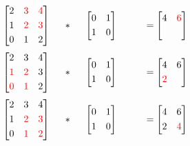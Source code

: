 \[
\begin{bmatrix}
       2 & \textcolor{red}3 & \textcolor{red}4           \\[0.3em]
       1 & \textcolor{red}2 & \textcolor{red}3 \\[0.3em]
       0 & 1 & 2
     \end{bmatrix}
\hspace*{0.5cm}
*
\hspace*{0.5cm}
\begin{bmatrix}
       0 & 1 \\[0.3em]
       1 & 0        
     \end{bmatrix}     
\hspace*{1cm}
 = \begin{bmatrix}
       4 & \textcolor{red}6 \\[0.3em]
         &         
     \end{bmatrix}
\]
\[
\begin{bmatrix}
       2 & 3 & 4           \\[0.3em]
       \textcolor{red}1 & \textcolor{red}2 & 3 \\[0.3em]
       \textcolor{red}0 & \textcolor{red}1 & 2
     \end{bmatrix}
\hspace*{0.5cm}
*
\hspace*{0.5cm}
\begin{bmatrix}
       0 & 1 \\[0.3em]
       1 & 0        
     \end{bmatrix}     
\hspace*{1cm}
 = \begin{bmatrix}
       4 & 6 \\[0.3em]
       \textcolor{red}2 &         
     \end{bmatrix}
\]
\[
\begin{bmatrix}
       2 & 3 & 4           \\[0.3em]
       1 & \textcolor{red}2 & \textcolor{red}3 \\[0.3em]
       0 & \textcolor{red}1 & \textcolor{red}2
     \end{bmatrix}
\hspace*{0.5cm}
*
\hspace*{0.5cm}
\begin{bmatrix}
       0 & 1 \\[0.3em]
       1 & 0        
     \end{bmatrix}     
\hspace*{1cm}
 = \begin{bmatrix}
       4 & 6 \\[0.3em]
       2 & \textcolor{red}4        
     \end{bmatrix}
\]

